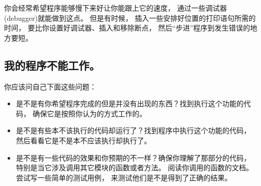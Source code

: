 你会经常希望程序能够慢下来好让你能跟上它的速度， 通过一些调试器(debugger)就能做到这点。  但是有时候， 插入一些安排好位置的打印语句所需的时间， 要比你设置好调试器、插入和移除断点， 然后“步进”程序到发生错误的地方要短。


\subsection{我的程序不能工作。}


你应该问自己下面这些问题：

\begin{itemize}


\item 是不是有你希望程序完成的但是并没有出现的东西？找到执行这个功能的代码， 确保它是按照你认为的方式工作的。


\item  是不是有些本不该执行的代码却运行了？找到程序中执行这个功能的代码， 然后看看它是不是本不应该执行却执行了。


\item  是不是有一些代码的效果和你预期的不一样？确保你理解了那部分的代码， 特别是当它涉及调用其它模块的函数或者方法。  阅读你调用的函数的文档。  尝试写一些简单的测试用例， 来测试他们是不是得到了正确的结果。

\end{itemize}


